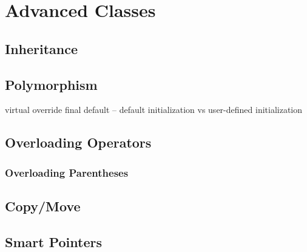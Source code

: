 \chapter{Advanced Classes}
\section{Inheritance}
\section{Polymorphism}
virtual
override
final
default -- default initialization vs user-defined initialization
\section{Overloading Operators}
\label{overloadingops}
\subsection{Overloading Parentheses}
\label{functionobjects}
\section{Copy/Move}
\section{Smart Pointers}

